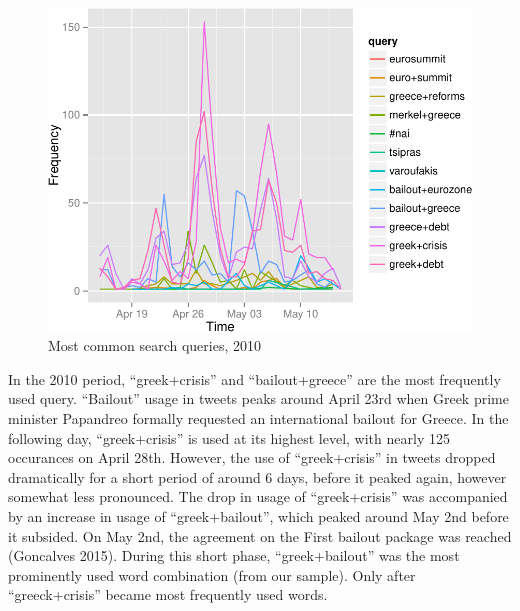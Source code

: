\documentclass[]{article}
\begin{document}
\begin{figure}

{\centering \includegraphics{fin_paper_files/figure-latex/unnamed-chunk-8-1} 

}

\caption{Most common search queries, 2010}\label{fig:unnamed-chunk-8}
\end{figure}

In the 2010 period, ``greek+crisis'' and ``bailout+greece'' are the most
frequently used query. ``Bailout'' usage in tweets peaks around April
23rd when Greek prime minister Papandreo formally requested an
international bailout for Greece. In the following day, ``greek+crisis''
is used at its highest level, with nearly 125 occurances on April 28th.
However, the use of ``greek+crisis'' in tweets dropped dramatically for
a short period of around 6 days, before it peaked again, however
somewhat less pronounced. The drop in usage of ``greek+crisis'' was
accompanied by an increase in usage of ``greek+bailout'', which peaked
around May 2nd before it subsided. On May 2nd, the agreement on the
First bailout package was reached (Goncalves 2015). During this short
phase, ``greek+bailout'' was the most prominently used word combination
(from our sample). Only after ``greeck+crisis'' became most frequently
used words.
\end{document}
